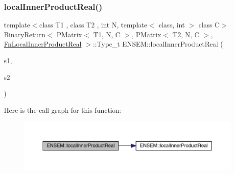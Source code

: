 \subsubsection{\texorpdfstring{localInnerProductReal()}{localInnerProductReal()}\hspace{0.1cm}{\footnotesize\ttfamily [1/3]}}
{\footnotesize\ttfamily template$<$class T1 , class T2 , int N, template$<$ class, int $>$ class C$>$ \\
\mbox{\hyperlink{structENSEM_1_1BinaryReturn}{Binary\+Return}}$<$ \mbox{\hyperlink{classENSEM_1_1PMatrix}{P\+Matrix}}$<$ T1, \mbox{\hyperlink{adat__devel_2lib_2hadron_2operator__name__util_8cc_a7722c8ecbb62d99aee7ce68b1752f337}{N}}, C $>$, \mbox{\hyperlink{classENSEM_1_1PMatrix}{P\+Matrix}}$<$ T2, \mbox{\hyperlink{adat__devel_2lib_2hadron_2operator__name__util_8cc_a7722c8ecbb62d99aee7ce68b1752f337}{N}}, C $>$, \mbox{\hyperlink{structENSEM_1_1FnLocalInnerProductReal}{Fn\+Local\+Inner\+Product\+Real}} $>$\+::Type\+\_\+t E\+N\+S\+E\+M\+::local\+Inner\+Product\+Real (\begin{DoxyParamCaption}\item[{const \mbox{\hyperlink{classENSEM_1_1PMatrix}{P\+Matrix}}$<$ T1, \mbox{\hyperlink{adat__devel_2lib_2hadron_2operator__name__util_8cc_a7722c8ecbb62d99aee7ce68b1752f337}{N}}, C $>$ \&}]{s1,  }\item[{const \mbox{\hyperlink{classENSEM_1_1PMatrix}{P\+Matrix}}$<$ T2, \mbox{\hyperlink{adat__devel_2lib_2hadron_2operator__name__util_8cc_a7722c8ecbb62d99aee7ce68b1752f337}{N}}, C $>$ \&}]{s2 }\end{DoxyParamCaption})\hspace{0.3cm}{\ttfamily [inline]}}

Here is the call graph for this function\+:\nopagebreak
\begin{figure}[H]
\begin{center}
\leavevmode
\includegraphics[width=350pt]{df/d0a/group__primmatrix_ga512767c96aa10eafdf3b60be8dd2e9bb_cgraph}
\end{center}
\end{figure}
\mbox{\label{group__primmatrix_ga9db3f5557c105ded2a1e426229646f23}} 
